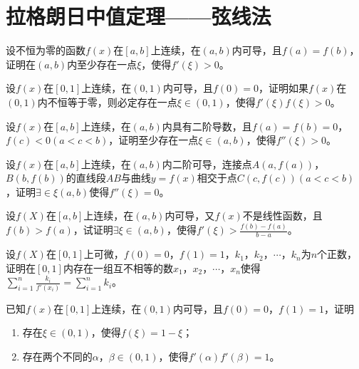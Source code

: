 \section{拉格朗日中值定理——弦线法}
\begin{example}
	设不恒为零的函数$f(x)$在$[a,b]$上连续，在$(a,b)$内可导，且$f(a)=f(b)$，证明在$(a,b)$内至少存在一点$\xi$，使得$f'(\xi)>0$。
\end{example}

\begin{example}
	设$f(x)$在$[0,1]$上连续，在$(0,1)$内可导，且$f(0)=0$，证明如果$f(x)$在$(0,1)$内不恒等于零，则必定存在一点$\xi\in(0,1)$，使得$f'(\xi)f(\xi)>0$。
\end{example}

\begin{example}
	设$f(x)$在$[a,b]$上连续，在$(a,b)$内具有二阶导数，且$f(a)=f(b)=0$，$f(c)<0(a<c<b)$，证明至少存在一点$\xi\in(a,b)$，使得$f''(\xi)>0$。
\end{example}

\begin{example}
	设$f(x)$在$[a,b]$上连续，在$(a,b)$内二阶可导，连接点$A(a,f(a))$，$B(b,f(b))$的直线段$AB$与曲线$y=f(x)$相交于点$C(c,f(c))(a<c<b)$，证明$\exists\in\xi(a,b)$使得$f''(\xi)=0$。
\end{example}

\begin{example}
	设$f(X)$在$[a,b]$上连续，在$(a,b)$内可导，又$f(x)$不是线性函数，且$f(b)>f(a)$，试证明$\exists\xi\in(a,b)$，使得$f'(\xi)>\frac{f(b)-f(a)}{b-a}$。
\end{example}

\begin{example}
	\color{red}设$f(X)$在$[0,1]$上可微，$f(0)=0$，$f(1)=1$，$k_1$，$k_2$，$\cdots$，$k_n$为$n$个正数，证明在$[0,1]$内存在一组互不相等的数$x_1$，$x_2$，$\cdots$，$x_n$使得$\sum_{i=1}^n\frac{k_i}{f'(x_i)}=\sum_{i=1}^nk_i$\color{black}。
\end{example}

\begin{example}
	\color{red}已知$f(x)$在$[0,1]$上连续，在$(0,1)$内可导，且$f(0)=0$，$f(1)=1$，证明
	\begin{enumerate}
		\item 存在$\xi\in(0,1)$，使得$f(\xi)=1-\xi$\color{black}；
		\color{red}\item 存在两个不同的$\alpha$，$\beta\in(0,1)$，使得$f'(\alpha)f'(\beta)=1$\color{black}。
	\end{enumerate}
\end{example}

